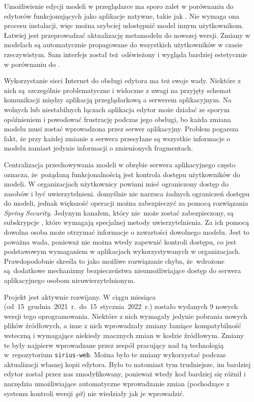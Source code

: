 Umożliwienie edycji modeli w przeglądarce ma sporo zalet w porównaniu do
edytorów funkcjonujących jako aplikacje natywne, takie jak \SiriusDesktop{}.
Nie wymaga ona procesu instalacji, więc można szybciej
udostępnić
model innym użytkownikom. Łatwiej jest przeprowadzać aktualizację metamodelu do
nowszej wersji. Zmiany w modelach są automatycznie propagowane do wszystkich
użytkowników w czasie rzeczywistym. Sam interfejs został też~odświeżony i
wygląda bardziej estetycznie w porównaniu do \SiriusDesktop{}.

Wykorzystanie sieci Internet do obsługi edytora ma też swoje wady. Niektóre z
nich są~szczególnie problematyczne i widoczne z uwagi na przyjęty schemat
komunikacji między aplikacją przeglądarkową a serwerem aplikacyjnym. Na wolnych
lub niestabilnych łączach aplikacja edytor może działać ze sporym opóźnieniem i
powodować frustrację podczas jego obsługi, bo każda zmiana modelu musi zostać
wprowadzona przez serwer aplikacyjny. Problem pogarsza fakt, że przy każdej
zmianie z serwera przesyłane są wszystkie informacje o modelu zamiast jedynie
informacji o zmienionych fragmentach.

Centralizacja przechowywania modeli w obrębie serwera aplikacyjnego często
oznacza, że~pożądaną funkcjonalnością jest kontrola dostępu użytkowników do
modeli. W organizacjach użytkownicy powinni mieć ograniczony dostęp do zasobów
i być uwierzytelnieni. \SiriusWeb{} domyślnie nie narzuca żadnych
ograniczeń dostępu do modeli, jednak większość operacji można zabezpieczyć za
pomocą rozwiązania \emph{Spring Security}. Jedynym kanałem, który nie~może
zostać
zabezpieczony, są subskrypcje \GraphQL{}, które wymagają specjalnej metody
uwierzytelnienia. Za ich pomocą dowolna osoba może otrzymać informacje o
zawartości dowolnego modelu. Jest to poważna wada, ponieważ nie można wtedy
zapewnić kontroli dostępu, co jest podstawowym wymaganiem w aplikacjach
wykorzystywanych w organizacjach. Prawdopodobnie skreśla to \SiriusWeb{}
jako możliwe rozwiązanie chyba, że~wdrożone są~dodatkowe mechanizmy
bezpieczeństwa nieumożliwiające dostęp do serwera aplikacyjnego osobom
nieuwierzytelnionym.

Projekt \SiriusWeb{} jest aktywnie rozwijany. W ciągu miesiąca
(od~15~grudnia~2021~r.~do~15~stycznia~2022~r.) zostało wydanych 9 nowych
wersji tego
oprogramowania. Niektóre z nich wymagały jedynie pobrania nowych plików
źródłowych, a inne z nich wprowadzały zmiany łamiące kompatybilność wsteczną i
wymagające niekiedy znacznych zmian w kodzie źródłowym. Zmiany te były najpierw
wprowadzane przez zespół pracujący nad tą technologią w~repozytorium
\texttt{sirius-web}. Można było te zmiany wykorzystać podczas aktualizacji
własnej kopii edytora. Było to natomiast tym trudniejsze, im bardziej edytor
został przez nas zmodyfikowany, ponieważ wtedy kod bardziej się różnił i
narzędzia umożliwiające automatyczne wprowadzanie zmian (pochodzące z systemu
kontroli wersji \emph{git}) nie wiedziały jak je wprowadzić.

